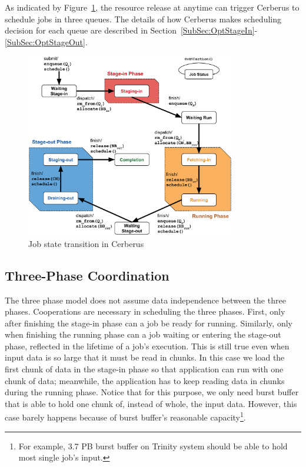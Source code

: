 As indicated by Figure~\ref{Fig:JobFSM}, the resource release at anytime can trigger Cerberus
to schedule jobs in three queues.
The details of how Cerberus makes scheduling decision for each queue are
described in Section~\ref{SubSec:OptStageIn}-\ref{SubSec:OptStageOut}.

\begin{figure}[htp]
\centering
        \includegraphics[width=3.6in]{3PhaseJobFSM}
        \caption{Job state transition in Cerberus}
\label{Fig:JobFSM}
\end{figure}

\subsection{Three-Phase Coordination}
\label{SubSec:Coordination}
The three phase model does not assume data independence between the three phases.
Cooperations are necessary in scheduling the three phases.
First, only after finishing the stage-in phase can a job be ready for running.
Similarly, only when finishing the running phase can a job waiting or entering the stage-out phase,
reflected in the lifetime of a job's execution.
This is still true even when input data is so large that it must be read in chunks.
In this case we load the first chunk of data in the stage-in phase so that application
can run with one chunk of data;
meanwhile, the application has to keep reading data in chunks during the running phase.
Notice that for this purpose, we only need burst buffer that is able to hold one chunk
of, instead of whole, the input data.
However, this case barely happens because of burst buffer's reasonable capacity\footnote{For
example, 3.7 PB burst buffer on Trinity system should be able to hold most single job's input.}.


